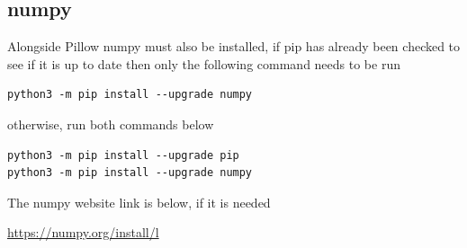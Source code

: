 \documentclass{article}
\begin{document}
\subsection{numpy}
Alongside Pillow numpy must also be installed, if pip has already been checked to see if it is up to date then only the following command needs to be run
\begin{lstlisting}
python3 -m pip install --upgrade numpy
\end{lstlisting}
otherwise, run both commands below
\begin{lstlisting}
python3 -m pip install --upgrade pip
python3 -m pip install --upgrade numpy
\end{lstlisting}
The numpy website link is below, if it is needed
\begin{center}
\url{https://numpy.org/install/l}
\end{center}
\end{document}
